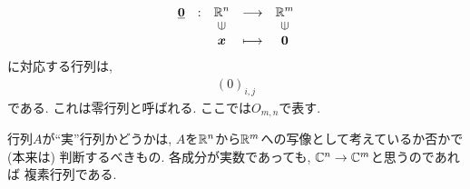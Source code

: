 \begin{remark}
  \begin{align*}
    \shazo{\underline{\zzero}}
          {\RR^n}{\RR^m}
          {\xx}{\zzero}
\end{align*}
  に対応する行列は,
\begin{align*}
  (0)_{i,j}
\end{align*}
である.
これは零行列と呼ばれる.
ここでは$O_{m,n}$で表す.
\end{remark}
\begin{remark}
  行列$A$が``実''行列かどうかは,
  $A$を$\mathbb{R}^n$から$\mathbb{R}^m$への写像として考えているか否かで
  (本来は) 判断するべきもの.
  各成分が実数であっても,
  $\mathbb{C}^n\to \mathbb{C}^m$と思うのであれば
  複素行列である.
\end{remark}



